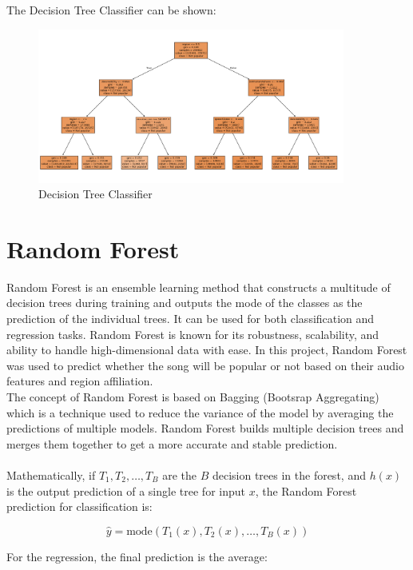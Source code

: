 \newpage
The Decision Tree Classifier can be shown:

\begin{figure}[H] 
    \centering 
    \includegraphics[width=0.9\textwidth]{media/decision_tree.png}
    \caption{Decision Tree Classifier}
    \label{fig:decision_tree}
\end{figure}



\section{Random Forest}
Random Forest is an ensemble learning method that constructs a multitude of decision trees during
training and outputs the mode of the classes as the prediction of the individual trees. It can be used for both classification and regression
tasks. Random Forest
is known for its robustness, scalability, and ability to handle high-dimensional data with ease.
In this project, Random Forest was used to predict whether the song will be popular or not based on their audio
features and region affiliation. \\
The concept of Random Forest is based on Bagging (Bootsrap Aggregating) which is a technique used to reduce the variance of the model
by averaging the predictions of multiple models. Random Forest builds multiple decision trees and merges them together to get a more
accurate and stable prediction.
\\
\\
Mathematically, if \( T_1, T_2, \dots, T_B \) are the \( B \) decision trees in the forest, and \( h(x) \) is the output prediction of a single tree for input \( x \), the Random Forest prediction for classification is:

\[
\hat{y} = \text{mode} \left( T_1(x), T_2(x), \dots, T_B(x) \right)
\]

For the regression, the final prediction is the average:

